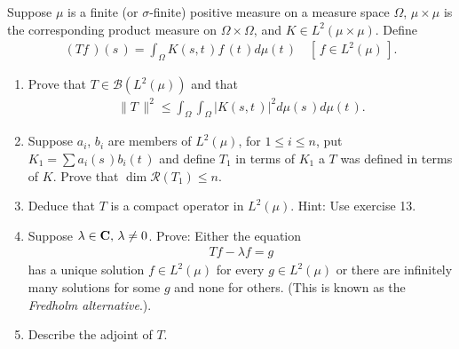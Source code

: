 %
{ \CMUCS Suppose $\mu$ is a finite (or $\sigma$-finite) positive measure on a measure space $\Omega$, $\mu\times\mu$ is the corresponding product measure on $\Omega\times\Omega$, and $K\in L^2(\mu\times\mu)$. Define 
\begin{align*}
(Tf\,)(s\,)=\int_\Omega K(s,t\,) f\,(t\,) d\mu(t\,)\quad [\,f\in L^2(\mu)\,].
\end{align*}
\begin{enumerate}
\renewcommand{\labelenumi}{(\alph{enumi})}
\item Prove that $T\in \mathscr{B}(L^2(\mu))$ and that 
\begin{align*}
\| T\, \|^2 \leq \int_\Omega\int_\Omega \lvert K (s,t\,)\rvert ^2 d\mu (s\,) d\mu(t\,).
\end{align*}
\item Suppose $a_i$, $b_i$ are members of $L^2(\mu)$, for $1\leq i\leq n$, put $K_1=\sum a_i(s\,)b_i(t\,)$ and define $T_1$ in terms of $K_1$ a $T$ was defined in terms of $K$. Prove that $\dim \mathscr{R}(T_1)\leq n$.
\item Deduce that $T$ is a compact operator in $L^2(\mu)$. Hint: Use exercise 13.
\item Suppose $\lambda\in {\mathbf C},\, \lambda\neq 0$. Prove: Either the equation 
\begin{align*}Tf-\lambda f=g\end{align*}
has a unique solution $f\in L^2(\mu)$ for every $g\in L^2(\mu)$ or there are infinitely many solutions for some $g$ and none for others. (This is known as the \textsl{Fredholm alternative}.).
\item Describe the adjoint of $T$.
 \end{enumerate}
}
